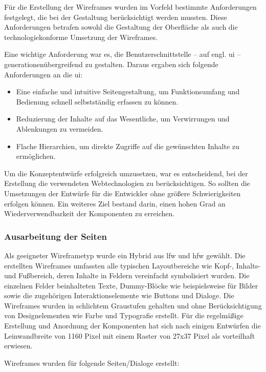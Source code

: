 Für die Erstellung der Wireframes wurden im Vorfeld bestimmte Anforderungen festgelegt, die bei der Gestaltung berücksichtigt werden mussten. Diese Anforderungen betrafen sowohl die Gestaltung der Oberfläche als auch die technologiekonforme Umsetzung der Wireframes.

Eine wichtige Anforderung war es, die Benutzerschnittstelle -- auf engl. \acrfull{ui} -- generationenübergreifend zu gestalten. Daraus ergaben sich folgende Anforderungen an die \acrshort{ui}:

\begin{itemize}
    \item Eine einfache und intuitive Seitengestaltung, um Funktionsumfang und Bedienung schnell selbstständig erfassen zu können.
    \item Reduzierung der Inhalte auf das Wesentliche, um Verwirrungen und Ablenkungen zu vermeiden.
    \item Flache Hierarchien, um direkte Zugriffe auf die gewünschten Inhalte zu ermöglichen.
\end{itemize}

Um die Konzeptentwürfe erfolgreich umzusetzen, war es entscheidend, bei der Erstellung die verwendeten Webtechnologien zu berücksichtigen. So sollten die Umsetzungen der Entwürfe für die Entwickler ohne größere Schwierigkeiten erfolgen können. Ein weiteres Ziel bestand darin, einen hohen Grad an Wiederverwendbarkeit der Komponenten zu erreichen.

\subsubsection{Ausarbeitung der Seiten}

Als geeigneter Wireframetyp wurde ein Hybrid aus \acrshort{lfw} und \acrshort{hfw} gewählt. Die erstellten Wireframes umfassten alle typischen Layoutbereiche wie Kopf-, Inhalts- und Fußbereich, deren Inhalte in Feldern vereinfacht symbolisiert wurden. Die einzelnen Felder beinhalteten Texte, Dummy-Blöcke wie beispielsweise für Bilder sowie die zugehörigen Interaktionselemente wie Buttons und Dialoge.
Die Wireframes wurden in schlichtem Graustufen gehalten und ohne Berücksichtigung von Designelementen wie Farbe und Typografie erstellt. Für die regelmäßige Erstellung und Anordnung der Komponenten hat sich nach einigen Entwürfen die Leinwandbreite von 1160 Pixel mit einem Raster von 27x37 Pixel als vorteilhaft erwiesen.


Wireframes wurden für folgende Seiten/Dialoge erstellt:

